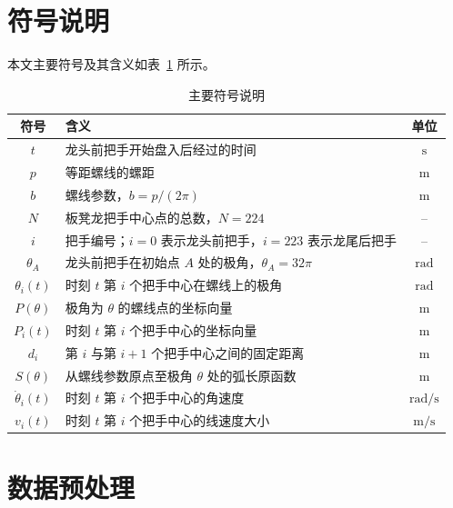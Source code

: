 \documentclass[UTF8,fontset=windows,a4paper,12pt]{ctexart}
\begin{document}
\clearpage
\section{符号说明}

本文主要符号及其含义如表~\ref{tab:symbols} 所示。

\begin{table}[H]
  \centering
  \caption{主要符号说明}
  \label{tab:symbols}
  \begin{tabular}{cp{}c}
    \toprule
    符号 & 含义 & 单位 \\
    \midrule
    $t$ & 龙头前把手开始盘入后经过的时间 & $\mathrm{s}$ \\
    $p$ & 等距螺线的螺距 & $\mathrm{m}$ \\
    $b$ & 螺线参数，$b=p/(2\pi)$ & $\mathrm{m}$ \\
    $N$ & 板凳龙把手中心点的总数，$N=224$ & -- \\
    $i$ & 把手编号；$i=0$ 表示龙头前把手，$i=223$ 表示龙尾后把手 & -- \\
    $\theta_A$ & 龙头前把手在初始点 $A$ 处的极角，$\theta_A=32\pi$ & $\mathrm{rad}$ \\
    $\theta_i(t)$ & 时刻 $t$ 第 $i$ 个把手中心在螺线上的极角 & $\mathrm{rad}$ \\
    $P(\theta)$ & 极角为 $\theta$ 的螺线点的坐标向量 & $\mathrm{m}$ \\
    $P_i(t)$ & 时刻 $t$ 第 $i$ 个把手中心的坐标向量 & $\mathrm{m}$ \\
    $d_i$ & 第 $i$ 与第 $i+1$ 个把手中心之间的固定距离 & $\mathrm{m}$ \\
    $S(\theta)$ & 从螺线参数原点至极角 $\theta$ 处的弧长原函数 & $\mathrm{m}$ \\
    $\dot\theta_i(t)$ & 时刻 $t$ 第 $i$ 个把手中心的角速度 & $\mathrm{rad/s}$ \\
    $v_i(t)$ & 时刻 $t$ 第 $i$ 个把手中心的线速度大小 & $\mathrm{m/s}$ \\
    \bottomrule
  \end{tabular}
\end{table}


\section{数据预处理}
\end{document}
